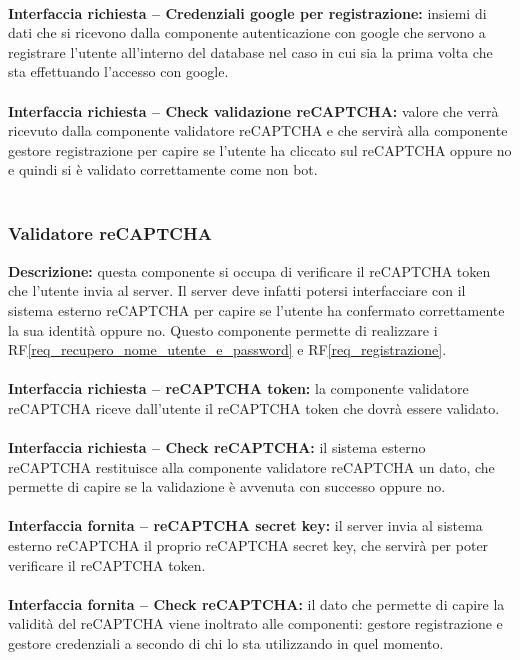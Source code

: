 \\
\textbf{Interfaccia richiesta – Credenziali google per registrazione: }insiemi di dati che si ricevono dalla componente autenticazione con google che servono a registrare l'utente all'interno del database nel caso in cui sia la prima volta che sta effettuando l'accesso con google.\\
\\
\textbf{Interfaccia richiesta – Check validazione reCAPTCHA: }valore che verrà ricevuto dalla componente validatore reCAPTCHA e che servirà alla componente gestore registrazione per capire se l'utente ha cliccato sul reCAPTCHA oppure no e quindi si è validato correttamente come non bot.\\
\\

\subsubsection{Validatore reCAPTCHA}
\textbf{Descrizione:} questa componente si occupa di verificare il reCAPTCHA token che l'utente invia al server. Il server deve infatti potersi interfacciare con il sistema esterno reCAPTCHA per capire se l'utente ha confermato correttamente la sua identità oppure no. Questo componente permette di realizzare i RF\ref{req_recupero_nome_utente_e_password} e RF\ref{req_registrazione}. \\
\\
\textbf{Interfaccia richiesta – reCAPTCHA token:} la componente validatore reCAPTCHA riceve dall'utente il reCAPTCHA token che dovrà essere validato. \\
\\
\textbf{Interfaccia richiesta – Check reCAPTCHA:} il sistema esterno reCAPTCHA restituisce alla componente validatore reCAPTCHA un dato, che permette di capire se la validazione è avvenuta con successo oppure no. \\
\\
\textbf{Interfaccia fornita – reCAPTCHA secret key:} il server invia al sistema esterno reCAPTCHA il proprio reCAPTCHA secret key, che servirà per poter verificare il reCAPTCHA token. \\
\\
\textbf{Interfaccia fornita – Check reCAPTCHA:} il dato che permette di capire la validità del reCAPTCHA viene inoltrato alle componenti: gestore registrazione e gestore credenziali a secondo di chi lo sta utilizzando in quel momento. \\
\\

